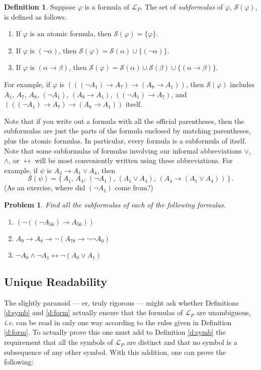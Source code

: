 \documentclass[12pt]{amsbook}
\newcommand{\fromto}{\leftrightarrow}
\theoremstyle{plain}
\newtheorem{prob}[thm]{Problem}
\theoremstyle{definition}
\newtheorem{defn}{Definition}[chapter]
\theoremstyle{remark}
\begin{document}
\begin{defn} \label{d:subf}  
Suppose $\varphi$ is a formula of $\mathcal{L}_P$.  The set of {\em subformulas\/} of $\varphi$,  $\mathcal{S}(\varphi)$,  is defined as follows.
\begin{enumerate}
\item If $\varphi$ is an atomic formula,  then $\mathcal{S}(\varphi) = \{ \varphi \}$.
\item If $\varphi$ is $(\lnot \alpha)$,  then $\mathcal{S}(\varphi) = \mathcal{S}(\alpha) \cup \{ (\lnot\alpha) \}$.
\item If $\varphi$ is $(\alpha \to \beta)$,  then $\mathcal{S}(\varphi) = \mathcal{S}(\alpha) \cup \mathcal{S}(\beta) \cup \{ (\alpha \to \beta) \}$.
\end{enumerate}
\end{defn}

For example,  if $\varphi$ is $(((\lnot A_1) \to A_7) \to (A_8 \to A_1))$,  then $\mathcal{S}(\varphi)$ includes $A_1$, $A_7$, $A_8$, $(\lnot A_1)$,  $(A_8 \to A_1)$, $((\lnot A_1) \to A_7)$, and $(((\lnot A_1) \to A_7) \to (A_8 \to A_1))$ itself.

Note that if you write out a formula with all the official parentheses,  then the subformulas are just the parts of the formula enclosed by matching parentheses,  plus the atomic formulas.  In particular,  every formula is a subformula of itself.  Note that some subformulas of formulas involving our informal abbreviations $\lor$,  $\land$,  or $\fromto$ will be most conveniently written using these abbreviations.  For example,  if $\psi$ is $A_4 \to A_1 \lor A_4$,  then 
\[
\mathcal{S}(\psi) = \{\, A_1,\, A_4,\, (\lnot A_1),\, (A_1 \lor A_4),\, (A_4 \to (A_1 \lor A_4)) \,\}\, .
\]
(As an exercise,  where did $(\lnot A_1)$ come from?)

\begin{prob} \label{p:one11}
Find all the subformulas of each of the following formulas.
\begin{enumerate}
\item $(\lnot ((\lnot A_{56}) \to A_{56}))$
\item $A_9 \to A_8 \to \lnot (A_{78} \to \lnot \lnot A_0)$
\item $\lnot A_0 \land \lnot A_1 \fromto \lnot (A_0 \lor A_1)$
\end{enumerate}
\end{prob}


\subsection*{Unique Readability}
The slightly paranoid --- er,  truly rigorous --- might ask whether Definitions \ref{d:symb} and \ref{d:form} actually ensure that the formulas of $\mathcal{L}_P$ are unambiguous,  {\em i.e.\/} can be read in only one way according to the rules given in Definition \ref{d:form}.  To actually prove this one must add to Definition \ref{d:symb} the requirement that all the symbols of $\mathcal{L}_P$ are distinct and that no symbol is a subsequence of any other symbol.  With this addition,  one can prove the following:
\end{document}

